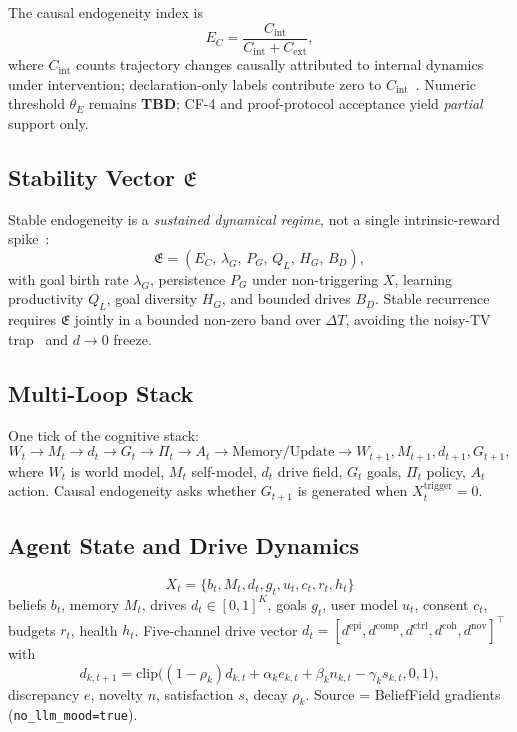 \documentclass[11pt,a4paper]{article}
\theoremstyle{definition}
\begin{document}
The causal endogeneity index is
\begin{equation}
E_C = \frac{C_{\mathrm{int}}}{C_{\mathrm{int}} + C_{\mathrm{ext}}},
\end{equation}
where $C_{\mathrm{int}}$ counts trajectory changes causally attributed to internal dynamics under intervention; declaration-only labels contribute zero to $C_{\mathrm{int}}$~\cite{kuznetsov2026stable}. Numeric threshold $\theta_E$ remains \textbf{TBD}; CF-4 and proof-protocol acceptance yield \emph{partial} support only.

\subsection{Stability Vector $\mathfrak{E}$}
Stable endogeneity is a \emph{sustained dynamical regime}, not a single intrinsic-reward spike~\cite{kuznetsov2026stable}:
\begin{equation}
\mathfrak{E} = (E_C,\, \lambda_G,\, P_G,\, Q_L,\, H_G,\, B_D),
\end{equation}
with goal birth rate $\lambda_G$, persistence $P_G$ under non-triggering $X$, learning productivity $Q_L$, goal diversity $H_G$, and bounded drives $B_D$. Stable recurrence requires $\mathfrak{E}$ jointly in a bounded non-zero band over $\Delta T$, avoiding the noisy-TV trap~\cite{burda2019large} and $d\to 0$ freeze.

\subsection{Multi-Loop Stack}
One tick of the cognitive stack:
\begin{equation}
W_t \to M_t \to d_t \to G_t \to \Pi_t \to A_t \to \text{Memory/Update} \to W_{t+1}, M_{t+1}, d_{t+1}, G_{t+1},
\end{equation}
where $W_t$ is world model, $M_t$ self-model, $d_t$ drive field, $G_t$ goals, $\Pi_t$ policy, $A_t$ action. Causal endogeneity asks whether $G_{t+1}$ is generated when $X_t^{\mathrm{trigger}}=0$.

\subsection{Agent State and Drive Dynamics}
\begin{equation}
X_t = \{b_t, M_t, d_t, g_t, u_t, c_t, r_t, h_t\}
\end{equation}
beliefs $b_t$, memory $M_t$, drives $d_t\in[0,1]^K$, goals $g_t$, user model $u_t$, consent $c_t$, budgets $r_t$, health $h_t$. Five-channel drive vector $d_t=[d^{\mathrm{epi}},d^{\mathrm{comp}},d^{\mathrm{ctrl}},d^{\mathrm{coh}},d^{\mathrm{nov}}]^\top$ with
\begin{equation}
d_{k,t+1}= \mathrm{clip}\big((1-\rho_k)d_{k,t}+\alpha_k e_{k,t}+\beta_k n_{k,t}-\gamma_k s_{k,t},0,1\big),
\end{equation}
discrepancy $e$, novelty $n$, satisfaction $s$, decay $\rho_k$. Source = BeliefField gradients (\texttt{no\_llm\_mood=true}).
\end{document}
